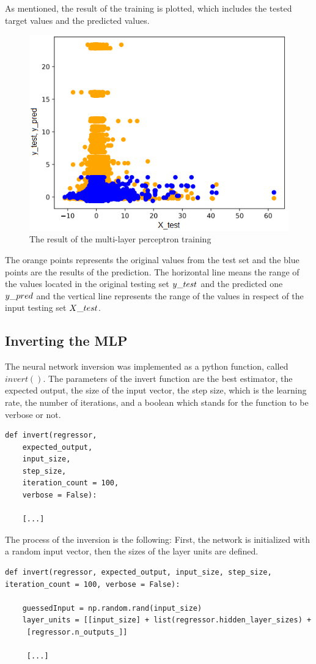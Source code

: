 As mentioned, the result of the training is plotted, which includes the tested target values and the predicted values.
\begin{figure}[h]
	\centering
	\includegraphics[height=0.45\linewidth]{./figures/plot}
	\caption{The result of the multi-layer perceptron training}
	\label{fig:plot}
\end{figure}

The orange points represents the original values from the test set and the blue points are the results of the prediction. The horizontal line means the range of the values located in the original testing set $y\char`_test$ and the predicted one $y\char`_pred$ and the vertical line represents the range of the values in respect of the input testing set $X\char`_test$.


\subsection{Inverting the MLP}

The neural network inversion was implemented as a python function, called $invert()$. The parameters of the invert function are the best estimator, the expected output, the size of the input vector, the step size, which is the learning rate, the number of iterations, and a boolean which stands for the function to be verbose or not.
\begin{lstlisting}
def invert(regressor, 
	expected_output, 
	input_size, 
	step_size, 
	iteration_count = 100, 
	verbose = False):
	
	[...]
\end{lstlisting}

\newpage

The process of the inversion is the following: First, the network is initialized with a random input vector, then the sizes of the layer units are defined. 
\begin{lstlisting}
def invert(regressor, expected_output, input_size, step_size, iteration_count = 100, verbose = False):

	guessedInput = np.random.rand(input_size)
	layer_units = [[input_size] + list(regressor.hidden_layer_sizes) +
	 [regressor.n_outputs_]]
	 
	 [...]
\end{lstlisting}

